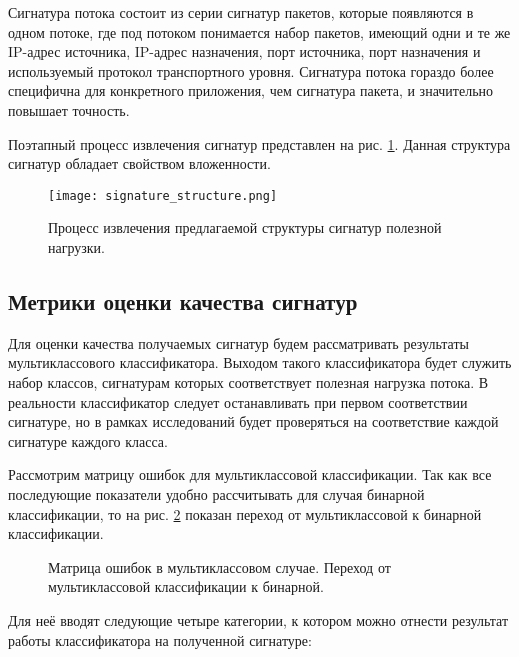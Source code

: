 Сигнатура потока состоит из серии сигнатур пакетов, которые появляются в одном потоке, где под потоком понимается набор пакетов,
имеющий одни и те же IP-адрес источника, IP-адрес назначения, порт источника, порт назначения и
используемый протокол транспортного уровня. Сигнатура потока гораздо более специфична для конкретного приложения,
чем сигнатура пакета, и значительно повышает точность.

Поэтапный процесс извлечения сигнатур представлен на рис. \ref{signature_process}.
Данная структура сигнатур обладает свойством вложенности.

\begin{figure}[h!]
    \begin{center}
        \texttt{[image: signature\_structure.png]}
        \caption{Процесс извлечения предлагаемой структуры сигнатур полезной нагрузки.}\label{signature_process}
    \end{center}
\end{figure}

\subsection{Метрики оценки качества сигнатур}

Для оценки качества получаемых сигнатур будем рассматривать результаты мультиклассового классификатора.
Выходом такого классификатора будет служить набор классов, сигнатурам которых соответствует полезная нагрузка потока.
В реальности классификатор следует останавливать при первом соответствии сигнатуре,
но в рамках исследований будет проверяться на соответствие каждой сигнатуре каждого класса.

Рассмотрим матрицу ошибок для мультиклассовой классификации. Так как все последующие показатели удобно рассчитывать
для случая бинарной классификации, то на рис. \ref{ConfusionMatrix} показан переход от мультиклассовой к бинарной классификации.

\begin{figure}[h!]
    \begin{center}
        
        \caption{Матрица ошибок в мультиклассовом случае. Переход от мультиклассовой классификации к бинарной.} \label{ConfusionMatrix}
    \end{center}
\end{figure}

Для неё вводят следующие четыре категории, к котором можно отнести результат работы классификатора на полученной сигнатуре:

